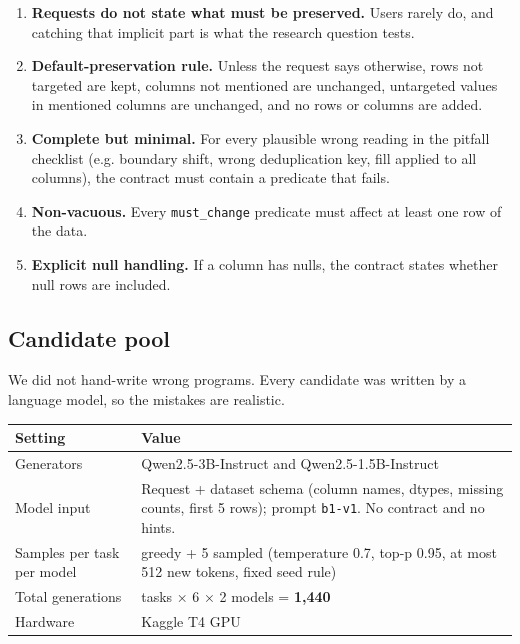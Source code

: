 \documentclass[11pt]{article}
\providecommand{\tightlist}{\setlength{\itemsep}{0pt}\setlength{\parskip}{0pt}}
\begin{document}
\begin{enumerate}
\def\labelenumi{\arabic{enumi}.}
\tightlist
\item
  \textbf{Requests do not state what must be preserved.} Users rarely
  do, and catching that implicit part is what the research question
  tests.
\item
  \textbf{Default-preservation rule.} Unless the request says otherwise,
  rows not targeted are kept, columns not mentioned are unchanged,
  untargeted values in mentioned columns are unchanged, and no rows or
  columns are added.
\item
  \textbf{Complete but minimal.} For every plausible wrong reading in
  the pitfall checklist (e.g. boundary shift, wrong deduplication key,
  fill applied to all columns), the contract must contain a predicate
  that fails.
\item
  \textbf{Non-vacuous.} Every \texttt{must\_\allowbreak{}change}
  predicate must affect at least one row of the data.
\item
  \textbf{Explicit null handling.} If a column has nulls, the contract
  states whether null rows are included.
\end{enumerate}

\subsection{Candidate pool}

We did not hand-write wrong programs. Every candidate was written by a
language model, so the mistakes are realistic.

\begin{table}[!tp]
\centering\footnotesize\setlength{\tabcolsep}{3pt}\renewcommand{\arraystretch}{1.1}
\begin{tabularx}{\textwidth}{l>{\raggedright\arraybackslash}X}
\toprule
\textbf{Setting} & \textbf{Value} \\
\midrule
Generators & Qwen2.5-3B-Instruct and Qwen2.5-1.5B-Instruct \\
Model input & Request + dataset schema (column names, dtypes, missing counts, first 5 rows); prompt \texttt{b1-v1}. No contract and no hints. \\
Samples per task per model & 1 greedy + 5 sampled (temperature 0.7, top-p 0.95, at most 512 new tokens, fixed seed rule) \\
Total generations & 120 tasks × 6 × 2 models = \textbf{1,440} \\
Hardware & Kaggle T4 GPU \\
\bottomrule
\end{tabularx}
\end{table}
\end{document}
